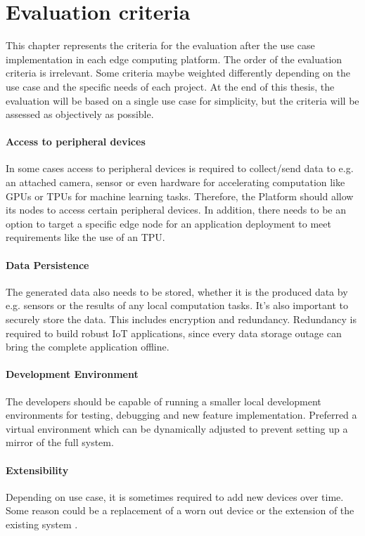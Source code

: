\chapter{Evaluation criteria}\label{chap:evaluation-criteria}
This chapter represents the criteria for the evaluation after the use case implementation in each edge computing platform. The order of the evaluation criteria is irrelevant. Some criteria maybe weighted differently depending on the use case and the specific needs of each project. At the end of this thesis, the evaluation will be based on a single use case for simplicity, but the criteria will be assessed as objectively as possible.

\subsubsection*{Access to peripheral devices}
In some cases access to peripheral devices is required to collect/send data to e.g. an attached camera, sensor or even hardware for accelerating computation like GPUs or TPUs for machine learning tasks. Therefore, the Platform should allow its nodes to access certain peripheral devices. In addition, there needs to be an option to target a specific edge node for an application deployment to meet requirements like the use of an TPU.

\subsubsection*{Data Persistence}
The generated data also needs to be stored, whether it is the produced data by e.g. sensors or the results of any local computation tasks. It’s also important to securely store the data. This includes encryption and redundancy. Redundancy is required to build robust \gls{IoT} applications, since every data storage outage can bring the complete application offline.

\subsubsection*{Development Environment}
The developers should be capable of running a smaller local development environments for testing, debugging and new feature implementation. Preferred a virtual environment which can be dynamically adjusted to prevent setting up a mirror of the full system.

\subsubsection*{Extensibility} 
Depending on use case, it is sometimes required to add new devices over time. Some reason could be a replacement of a worn out device or the extension of the existing system \cite{Shi2016b}.

